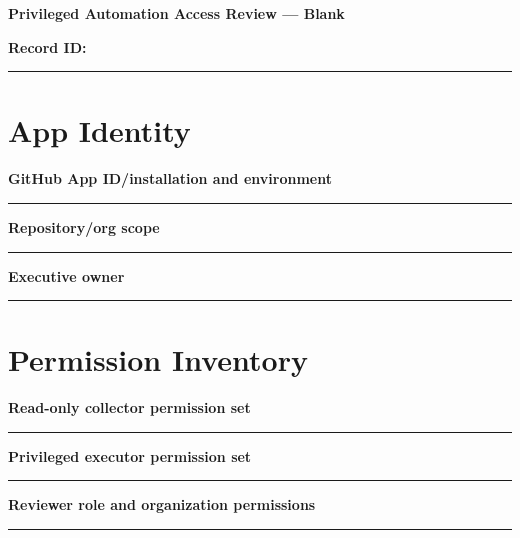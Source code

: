 \documentclass[11pt,letterpaper]{article}
\begin{document}
\begin{center}{\LARGE\bfseries Privileged Automation Access Review --- Blank}\par
\vspace{4pt}{\small Print-ready unfilled assessment instrument}\par
\end{center}
\noindent\textbf{Record ID:} \rule{2.6in}{0.4pt}\par
\section{App Identity}
\noindent\textbf{GitHub App ID/installation and environment}\par
\vspace{1.1em}\noindent\rule{0.96\linewidth}{0.4pt}\par\vspace{0.65em}
\noindent\textbf{Repository/org scope}\par
\vspace{1.1em}\noindent\rule{0.96\linewidth}{0.4pt}\par\vspace{0.65em}
\noindent\textbf{Executive owner}\par
\vspace{1.1em}\noindent\rule{0.96\linewidth}{0.4pt}\par\vspace{0.65em}
\section{Permission Inventory}
\noindent\textbf{Read-only collector permission set}\par
\vspace{1.1em}\noindent\rule{0.96\linewidth}{0.4pt}\par\vspace{0.65em}
\noindent\textbf{Privileged executor permission set}\par
\vspace{1.1em}\noindent\rule{0.96\linewidth}{0.4pt}\par\vspace{0.65em}
\noindent\textbf{Reviewer role and organization permissions}\par
\vspace{1.1em}\noindent\rule{0.96\linewidth}{0.4pt}\par\vspace{0.65em}
\end{document}
